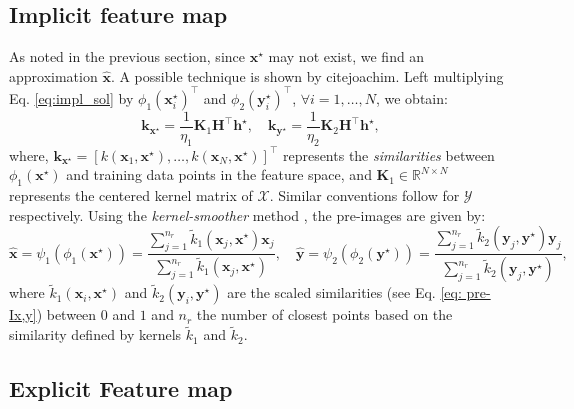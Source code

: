 \documentclass[preview,border=0.3pt]{standalone}
\begin{document}
\subsection{Implicit feature map}
\label{sec:implicit}
%
As noted in the previous section, since $ \bm{x}^{\star} $ may not exist, we find an approximation $ \hat{\bm{x}} $. A possible technique is shown by cite{joachim}. Left multiplying Eq. \ref{eq:impl_sol} by ${\phi}_{1}(\bm{x}_{i}^{\star})^{\top}$ and ${\phi}_{2}(\bm{y}_{i}^{\star})^{\top}$, $\forall i=1,\dots, N$, we obtain:
% 
\begin{equation}\label{eq:Kxy}
    {{\bm k}_{\bm{x}^{\star}}=\dfrac{1}{\eta_{1}}{\bm{K}}_{1}\bm{H}^\top \bm{h}^{\star}}, \quad    {{\bm{k}}_{\bm{y}^{\star}}=\dfrac{1}{\eta_{2}}{\bm{K}}_{2}\bm{H}^\top \bm{h}^{\star}},
\end{equation}
where, ${\bm k}_{\bm{x}^{\star}}=\left[ k(\bm{x}_{1}, \bm{x}^{\star}),\dots,k(\bm{x}_{N}, \bm{x}^{\star}) \right]^{\top}$ represents the \emph{similarities} between $\phi_1 (\bm{x}^{\star})$ and training data points in the feature space, and $\bm{K}_{1}\in \mathbb{R}^{N\times N}$ represents the centered kernel matrix of $\mathcal{X}$. Similar conventions follow for $\mathcal{Y}$ respectively. Using the \emph{kernel-smoother} method \cite{hastie01statisticallearning}, the pre-images are given by:
%
\begin{equation}\label{eq: pre-Ix,y}
    {\hat{\bm{x}} = \psi_1 \left( \phi_1 (\bm{x}^\star) \right) =\dfrac{\sum_{j=1}^{n_{r}} \tilde{k}_{1}(\bm{x}_{j}, \bm{x}^{\star})\bm{x}_j }{\sum_{j=1}^{n_{r}} \tilde{k}_{1}(\bm{x}_{j}, \bm{x}^{\star})}}, \quad    {\hat{\bm{y}}= \psi_2 \left( \phi_2 (\bm{y}^\star) \right) = \dfrac{\sum_{j=1}^{n_{r}} \tilde{k}_{2}(\bm{y}_{j}, \bm{y}^{\star})\bm{y}_j }{\sum_{j=1}^{n_{r}} \tilde{k}_{2}(\bm{y}_{j}, \bm{y}^{\star})}},
\end{equation}
where $\tilde{k}_1(\bm{x}_i,\bm{x}^{\star})$ and $\tilde{k}_2(\bm{y}_i,\bm{y}^{\star})$ are the scaled similarities (see Eq. \ref{eq: pre-Ix,y}) between $0$ and $1$ and $n_{r}$ the number of closest points based on the similarity defined by kernels $\tilde{k}_1$ and $\tilde{k}_2$.
% 
\subsection{Explicit Feature map}
\label{sec: explicit}
\end{document}
